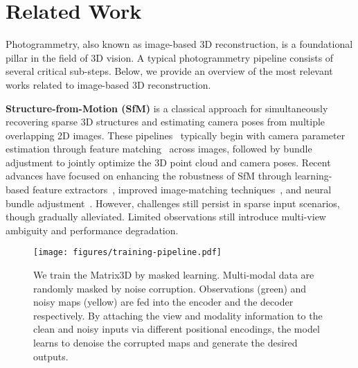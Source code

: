 \section{Related Work}
\label{sec:related}

Photogrammetry, also known as image-based 3D reconstruction, is a foundational pillar in the field of 3D vision. A typical photogrammetry pipeline consists of several critical sub-steps. Below, we provide an overview of the most relevant works related to image-based 3D reconstruction.

\textbf{Structure-from-Motion (SfM)} is a classical approach for simultaneously recovering sparse 3D structures and estimating camera poses from multiple overlapping 2D images. These pipelines~\cite{hartley2003multiple, crandall2012sfm, schoenberger2016sfm, cui2017hsfm} typically begin with camera parameter estimation through feature matching~\cite{harris1988combined, lowe2004distinctive, rosten2006machine, bay2006surf} across images, followed by bundle adjustment to jointly optimize the 3D point cloud and camera poses. Recent advances have focused on enhancing the robustness of SfM through learning-based feature extractors~\cite{detone2018superpoint, dusmanu2019d2, revaud2019r2d2, luo2020aslfeat}, improved image-matching techniques~\cite{sun2021loftr, sarlin2020superglue, chen2022aspanformer, lindenberger2023lightglue}, and neural bundle adjustment~\cite{lin2021barf, lindenberger2021pixel, xiao2023level, wang2024vggsfm}. However, challenges still persist in sparse input scenarios, though gradually alleviated. Limited observations still introduce multi-view ambiguity and performance degradation.


\begin{figure*}[t]
    \centering
    \texttt{[image: figures/training-pipeline.pdf]}
    \vspace{-6mm}
    \caption{We train the Matrix3D by masked learning. Multi-modal data are randomly masked by noise corruption. Observations (green) and noisy maps (yellow) are fed into the encoder and the decoder respectively. By attaching the view and modality information to the clean and noisy inputs via different positional encodings, the model learns to denoise the corrupted maps and generate the desired outputs.}
    \vspace{-6mm}
    \label{fig:pipeline}
\end{figure*}

